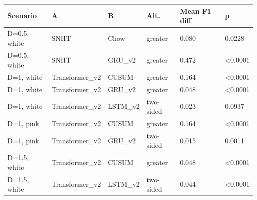 \begin{tabular}{llllll}
\toprule
Scenario & A & B & Alt. & Mean F1 diff & p \\
\midrule
D=0.5, white & SNHT & Chow & greater & 0.080 & 0.0228 \\
D=0.5, white & SNHT & GRU\_v2 & greater & 0.472 & <0.0001 \\
D=1, white & Transformer\_v2 & CUSUM & greater & 0.164 & <0.0001 \\
D=1, white & Transformer\_v2 & GRU\_v2 & greater & 0.048 & <0.0001 \\
D=1, white & Transformer\_v2 & LSTM\_v2 & two-sided & 0.023 & 0.0937 \\
D=1, pink & Transformer\_v2 & CUSUM & greater & 0.164 & <0.0001 \\
D=1, pink & Transformer\_v2 & GRU\_v2 & two-sided & 0.015 & 0.0011 \\
D=1.5, white & Transformer\_v2 & CUSUM & greater & 0.048 & <0.0001 \\
D=1.5, white & Transformer\_v2 & LSTM\_v2 & two-sided & 0.044 & <0.0001 \\
\bottomrule
\end{tabular}
